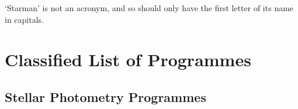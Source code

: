 `Starman' is not an acronym, and so should only have the first letter of
its name in capitals.

\newpage

\tableofcontents
\setlength{\parskip}{\medskipamount}
\markright{\stardocname}

\newpage



\section{Classified List of Programmes}
\label{se:class}
 
\subsection{Stellar Photometry Programmes}


